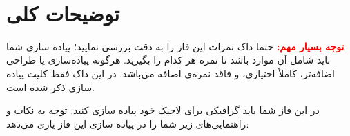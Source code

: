 \documentclass[]{article}
\begin{document}
\newpage
\pagestyle{fancy}
\fancyhf{}
\fancyfoot{}
\cfoot{\thepage}
\renewcommand{\headrulewidth}{2pt}

\KashidaOff



\tableofcontents

\newpage

 \Large \textbf{\\
}


\section*{{\titr توضیحات کلی}}

\textbf{\textcolor{red}{توجه بسیار مهم:}}
حتما داک نمرات این فاز را به دقت بررسی نمایید؛ پیاده سازی شما باید شامل آن موارد باشد تا نمره هر کدام را بگیرید. هرگونه پیاده‌سازی یا طراحی اضافه‌تر، کاملاً اختیاری، و فاقد نمره‌ی اضافه می‌باشد. در این داک فقط کلیت پیاده سازی ذکر شده است.

در این فاز شما باید گرافیکی برای لاجیک خود پیاده سازی کنید. توجه به نکات و راهنمایی‌های زیر شما را در پیاده سازی این فاز یاری می‌دهد:
\end{document}
